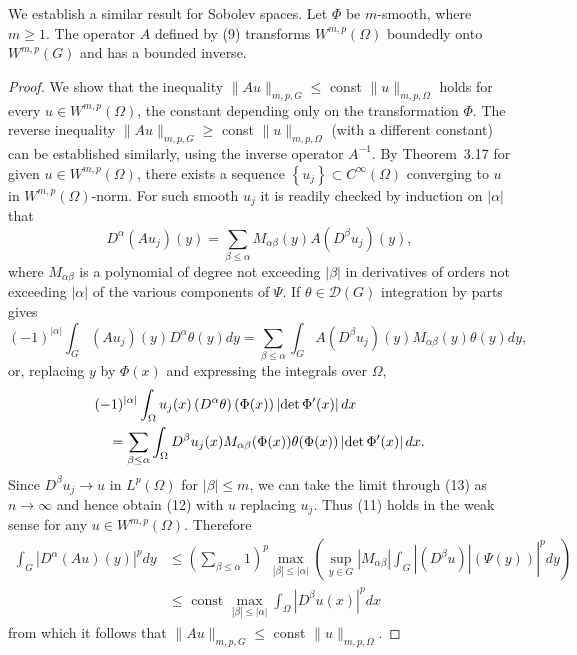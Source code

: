 \begin{theorem}
  We establish a similar result for Sobolev spaces.
  Let $\Phi$ be $m$-smooth, where $m \geq 1$. The operator $A$ defined by (9)
  transforms $W^{m,p}(\Omega)$ boundedly onto $W^{m,p}(G)$ and has a bounded inverse.
\end{theorem}

\begin{proof}
  We show that the inequality $\|A u\|_{m, p, G} \leq$ const $\|u\|_{m, p, \Omega}$ holds for 
  every $u \in W^{m,p}(\Omega)$, the constant depending only on the transformation $\Phi$.
  The reverse inequality $\|A u\|_{m, p, G} \geq$ const $\|u\|_{m, p, \Omega}$ (with a different 
  constant) can be established similarly, using the inverse operator $A^{-1}$.
  By Theorem~3.17 for given $u \in W^{m,p}(\Omega)$, there exists
  a sequence $\left\{u_j\right\} \subset C^{\infty}(\Omega)$ converging to $u$
  in $W^{m,p}(\Omega)$-norm.
  For such smooth $u_j$ it is readily checked by induction on $|\alpha|$ that
  \begin{equation}\label{eq:3.11}
    D^\alpha\left(A u_j\right)(y)=\sum_{\beta \leq \alpha} M_{\alpha \beta}(y) A\left(D^\beta u_j\right)(y),
  \end{equation}
  where $M_{\alpha \beta}$ is a polynomial of degree not exceeding $|\beta|$ in derivatives of 
  orders not exceeding $|\alpha|$ of the various components of $\Psi$.
  If $\theta \in \mathscr{D}(G)$ integration by parts gives
  \begin{equation}\label{eq:3.12}
    (-1)^{|\alpha|} \int_G\left(A u_j\right)(y) D^\alpha \theta(y) d y=\sum_{\beta \leq \alpha} \int_G A\left(D^\beta u_j\right)(y) M_{\alpha \beta}(y) \theta(y) d y,
  \end{equation}
  or, replacing $y$ by $\Phi(x)$ and expressing the integrals over $\Omega$,
  \begin{align}
  & (-1)^{|\alpha|} \int_{\Omega} u_j(x)\left(D^\alpha \theta\right)(\Phi(x))\left|\det \Phi^{\prime}(x)\right| d x \notag \\
  & \quad=\sum_{\beta \leq \alpha} \int_{\Omega} D^\beta u_j(x) M_{\alpha \beta}(\Phi(x)) \theta(\Phi(x))\left|\det \Phi^{\prime}(x)\right| d x . \label{eq:3.13}
  \end{align}
  Since $D^\beta u_j \rightarrow u$ in $L^p(\Omega)$ for $|\beta| \leq m$,
  we can take the limit through (13) as $n \rightarrow \infty$ and hence obtain (12) with $u$ 
  replacing $u_j$. Thus (11) holds in the weak sense for any $u \in W^{m,p}(\Omega)$. Therefore
  \[
  \begin{aligned}
  \int_G\left|D^\alpha(A u)(y)\right|^p d y & \leq\left(\sum_{\beta \leq \alpha} 1\right)^p \max _{|\beta| \leq|\alpha|}\left(\left.\sup _{y \in G}\left|M_{\alpha \beta}\right| \int_G\left|\left(D^\beta u\right)\right|(\Psi(y))\right|^p d y\right) \\
  & \leq \text { const } \max _{|\beta| \leq|\alpha|} \int_{\Omega}\left|D^\beta u(x)\right|^p d x
  \end{aligned}
  \]
  from which it follows that $\|A u\|_{m, p, G} \leq$ const $\|u\|_{m, p, \Omega}$.
\end{proof}

